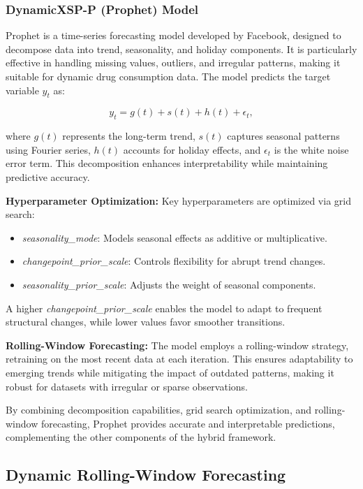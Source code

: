\documentclass[journal]{IEEEtran}
\begin{document}
\subsubsection{DynamicXSP-P (Prophet) Model}

Prophet is a time-series forecasting model developed by Facebook, designed to decompose data into trend, seasonality, and holiday components. It is particularly effective in handling missing values, outliers, and irregular patterns, making it suitable for dynamic drug consumption data. The model predicts the target variable \(y_t\) as:

\begin{equation}
y_{t} = g(t) + s(t) + h(t) + \epsilon_{t},
\end{equation}

where \(g(t)\) represents the long-term trend, \(s(t)\) captures seasonal patterns using Fourier series, \(h(t)\) accounts for holiday effects, and \(\epsilon_{t}\) is the white noise error term. This decomposition enhances interpretability while maintaining predictive accuracy.

\textbf{Hyperparameter Optimization:} Key hyperparameters are optimized via grid search:
\begin{itemize}
    \item \textit{seasonality\_mode}: Models seasonal effects as additive or multiplicative.
    \item \textit{changepoint\_prior\_scale}: Controls flexibility for abrupt trend changes.
    \item \textit{seasonality\_prior\_scale}: Adjusts the weight of seasonal components.
\end{itemize}
A higher \textit{changepoint\_prior\_scale} enables the model to adapt to frequent structural changes, while lower values favor smoother transitions.

\textbf{Rolling-Window Forecasting:} The model employs a rolling-window strategy, retraining on the most recent data at each iteration. This ensures adaptability to emerging trends while mitigating the impact of outdated patterns, making it robust for datasets with irregular or sparse observations.

By combining decomposition capabilities, grid search optimization, and rolling-window forecasting, Prophet provides accurate and interpretable predictions, complementing the other components of the hybrid framework.

\subsection{Dynamic Rolling-Window Forecasting}
\end{document}
